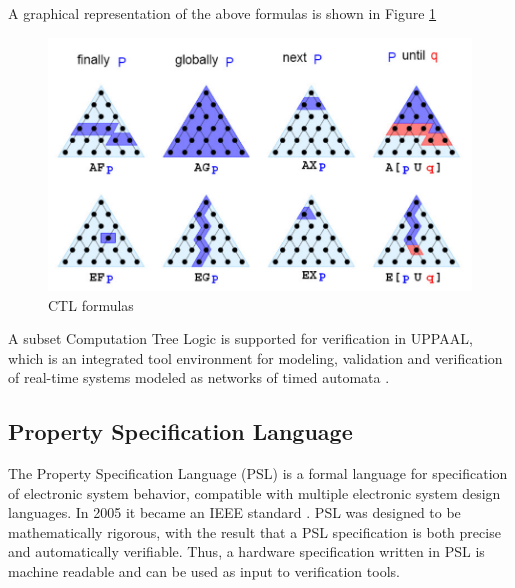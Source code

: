 A graphical representation of the above formulas is shown in Figure \ref{fig:ctl}
\begin{figure}[!h]
	\centering 
     \includegraphics[width=.9\textwidth]{Figs/ctl.PNG} 
     \caption{CTL formulas} 
     \label{fig:ctl} 
\end{figure} 

\noindent
A subset Computation Tree Logic is supported for verification in UPPAAL, which is an integrated tool environment for modeling, validation and verification of real-time systems modeled as networks of timed automata \citep{uppaal}.

\subsection{Property Specification Language}
\label{sec:PSL}

The Property Specification Language (PSL) \citep{eisner2007practical} is a formal language for specification of electronic system behavior, compatible with multiple electronic system design languages. In 2005 it became an IEEE standard \citep{ieee2005ieee}. PSL was designed to be mathematically rigorous, with the result that a PSL specification is both precise and automatically verifiable. Thus, a hardware specification written in PSL is machine readable and can be used as input to verification tools.

